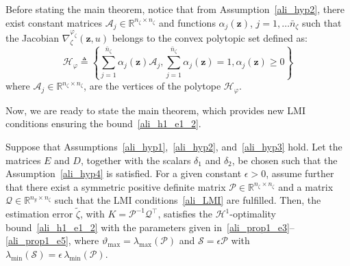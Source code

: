 %
Before stating the main theorem, notice that from Assumption~\ref{ali_hyp2}, there exist constant matrices $\mathcal{A}_{j} \in \mathbb{R}^{n_\zeta \times n_\zeta}$ and functions $\alpha_{j}(\bm{z})$, $j=1,\dots \bar{n}_{\zeta}$ such that the Jacobian $\nabla^{\varphi_{\zeta}}_{\zeta}(\bm{z},u)$ belongs to the convex polytopic set defined as:
\begin{equation}\label{varphi_zeta}
\mathcal{H}_{\varphi} \triangleq \left\{ \sum^{\bar{n}_{\zeta}}_{j=1}\alpha_{j} (\bm{z}) \mathcal{A}_{j}, \sum^{\bar{n}_{\zeta}}_{j=1}\alpha_{j}(\bm{z}) =1, \alpha_{j}(\bm{z}) \geq0 \right\}
\end{equation}
where $\mathcal{A}_{j} \in \mathbb{R}^{n_\zeta \times n_\zeta}$, are the vertices of the polytope $\mathcal{H}_{\varphi}$. 

Now, we are ready to state the main theorem, which provides new LMI conditions ensuring the bound~\eqref{ali_h1_e1_2}.

\begin{theorem}\label{ali_thm}
Suppose that Assumptions~\ref{ali_hyp1},~\ref{ali_hyp2}, and~\ref{ali_hyp3} hold. Let the matrices $E$ and $D$, together with the scalars $\delta_1$ and $\delta_2$, be chosen such that the Assumption~\ref{ali_hyp4} is satisfied. For a given constant $\epsilon > 0$, assume further that there exist a symmetric positive definite matrix $\mathcal{P} \in \mathbb{R}^{n_{\zeta}\times n_{\zeta}}$ and a matrix $\mathcal{Q} \in \mathbb{R}^{n_{y}\times n_{\zeta}}$ such that the LMI conditions~\eqref{ali_LMI} are fulfilled. Then, the estimation error $\tilde{\zeta}$, with $K = \mathcal{P}^{-1}\mathcal{Q}^{\top}$, satisfies the $\mathcal{H}^{1}$-optimality bound~\eqref{ali_h1_e1_2} with the parameters given in~\eqref{ali_prop1_e3}--\eqref{ali_prop1_e5}, where $\vartheta_{\max} = \lambda_{\max}\!\left( \mathcal{P} \right)$ and $\mathcal{S} = \epsilon \mathcal{P}$ with $\lambda_{\min}\!\left( \mathcal{S} \right)= \epsilon\, \lambda_{\min}\!\left( \mathcal{P} \right)$.
\end{theorem}

